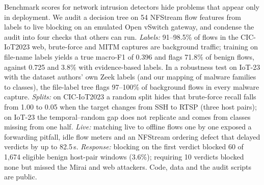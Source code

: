 Benchmark scores for network intrusion detectors hide problems that appear only in deployment. We audit a decision tree on 54 NFStream flow features from labels to live blocking on an emulated Open vSwitch gateway, and condense the audit into four checks that others can run. \emph{Labels:} 91--98.5\% of flows in the CIC-IoT2023 web, brute-force and MITM captures are background traffic; training on file-name labels yields a true macro-F1 of 0.396 and flags 71.8\% of benign flows, against 0.725 and 3.8\% with evidence-based labels. In a robustness test on IoT-23 with the dataset authors' own Zeek labels (and our mapping of malware families to classes), the file-label tree flags 97--100\% of background flows in every malware capture. \emph{Splits:} on CIC-IoT2023 a random split hides that brute-force recall falls from 1.00 to 0.05 when the target changes from SSH to RTSP (three host pairs); on IoT-23 the temporal--random gap does not replicate and comes from classes missing from one half. \emph{Live:} matching live to offline flows one by one exposed a forwarding pitfall, idle flow meters and an NFStream ordering defect that delayed verdicts by up to 82.5\,s. \emph{Response:} blocking on the first verdict blocked 60 of 1,674 eligible benign host-pair windows (3.6\%); requiring 10 verdicts blocked none but missed the Mirai and web attackers. Code, data and the audit scripts are public.
